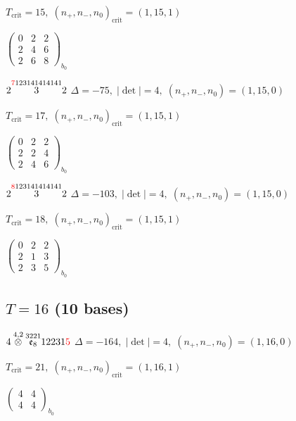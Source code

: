 \documentclass[10pt]{article}
\begin{document}
\hspace{1em}$T_{\text{crit}}=15,\; (n_+,n_-,n_0)_{\text{crit}}=(1,15,1)$

\hspace{2em}$\left(\begin{smallmatrix}0 & 2 & 2 \\ 2 & 4 & 6 \\ 2 & 6 & 8\end{smallmatrix}\right)_{\!b_0}$

$2\overset{\textcolor{red}{7}123141414141}{3}2$ \quad $\Delta=-75,\; |\det|=4,\; (n_+,n_-,n_0)=(1,15,0)$

\hspace{1em}$T_{\text{crit}}=17,\; (n_+,n_-,n_0)_{\text{crit}}=(1,15,1)$

\hspace{2em}$\left(\begin{smallmatrix}0 & 2 & 2 \\ 2 & 2 & 4 \\ 2 & 4 & 6\end{smallmatrix}\right)_{\!b_0}$

$2\overset{\textcolor{red}{8}123141414141}{3}2$ \quad $\Delta=-103,\; |\det|=4,\; (n_+,n_-,n_0)=(1,15,0)$

\hspace{1em}$T_{\text{crit}}=18,\; (n_+,n_-,n_0)_{\text{crit}}=(1,15,1)$

\hspace{2em}$\left(\begin{smallmatrix}0 & 2 & 2 \\ 2 & 1 & 3 \\ 2 & 3 & 5\end{smallmatrix}\right)_{\!b_0}$


\subsection*{$T = 16$ \quad (10 bases)}
\smallskip

$4\overset{4,2}{\otimes}\overset{3221}{\mathfrak{e}_8}12231\textcolor{red}{5}$ \quad $\Delta=-164,\; |\det|=4,\; (n_+,n_-,n_0)=(1,16,0)$

\hspace{1em}$T_{\text{crit}}=21,\; (n_+,n_-,n_0)_{\text{crit}}=(1,16,1)$

\hspace{2em}$\left(\begin{smallmatrix}4 & 4 \\ 4 & 4\end{smallmatrix}\right)_{\!b_0}$
\end{document}
